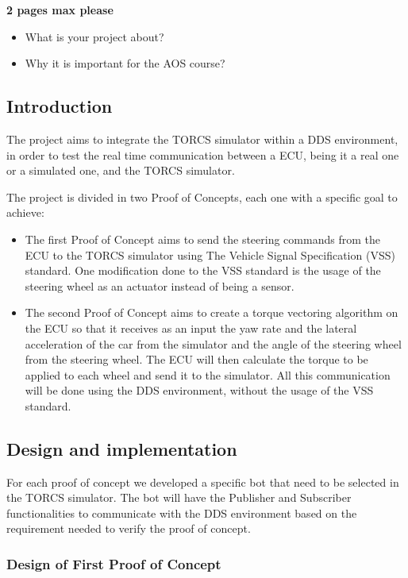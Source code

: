 \documentclass[10pt,a4]{article}
\begin{document}
\textbf{2 pages max please}

\begin{itemize}
  \item What is your project about?
  \item Why it is important for the AOS course?
\end{itemize}

\subsection{Introduction}

\par The project aims to integrate the TORCS simulator within a DDS environment, in order to test the real time
communication between a ECU, being it a real one or a simulated one, and the TORCS simulator.
\par The project is divided in two Proof of Concepts, each one with a specific goal to achieve:
\begin{itemize}
  \item The first Proof of Concept aims to send the steering commands from the ECU to the TORCS simulator using The
        Vehicle Signal Specification (VSS) standard. One modification done to the VSS standard is the usage of the steering
        wheel as an actuator instead of being a sensor.
  \item The second Proof of Concept aims to create a torque vectoring algorithm on the ECU so that it receives as an input
        the yaw rate and the lateral acceleration of the car from the simulator and the angle of the steering wheel from the steering
        wheel. The ECU will then calculate the torque to be applied to each wheel and send it to the simulator.
        All this communication will be done using the DDS environment, without the usage of the VSS standard.
\end{itemize}

\subsection{Design and implementation}


\par For each proof of concept we developed a specific bot that need to be selected in the TORCS simulator.
The bot will have the Publisher and Subscriber functionalities to communicate with the DDS environment based on
the requirement needed to verify the proof of concept.


\subsubsection{Design of First Proof of Concept}
\end{document}

